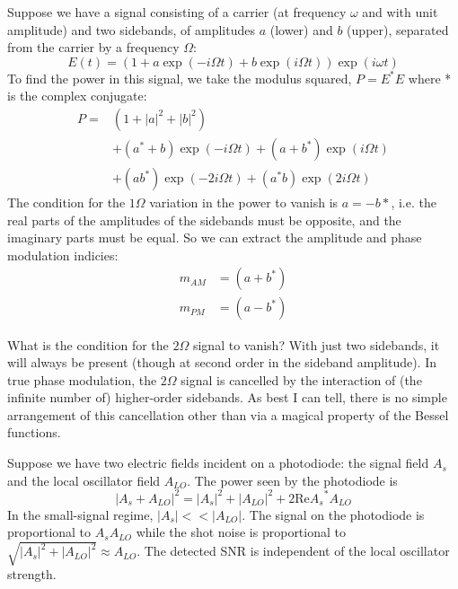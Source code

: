 \label{sec:am-vs-pm}
%
Suppose we have a signal consisting of a carrier (at frequency $\omega$ and
with unit amplitude) and two sidebands, of amplitudes $a$ (lower) and $b$
(upper), separated from the carrier by a frequency $\Omega$:
%
\begin{equation}
E(t) = \left(1 + a \exp(-i \Omega t) + b \exp(i \Omega t)\right)
\exp(i \omega t)
\end{equation}
%
To find the power in this signal, we take the
modulus squared, $P = E^*E$ where * is the complex conjugate:
%
\begin{equation}
\begin{split}
P = & \left(1 + |a|^2 + |b|^2\right) \\
    & + \left(a^* + b\right) \exp(-i \Omega t) + \left(a + b^*\right) \exp(i \Omega t) \\
    & + \left(ab^*\right) \exp(-2 i \Omega t) + \left(a^*b\right) \exp(2 i \Omega t)
\end{split}
\end{equation}
%
The condition for the $1\Omega$ variation in the power to vanish is
$a=-b*$, i.e. the real parts of the amplitudes of the sidebands must
be opposite, and the imaginary parts must be equal. So we can extract
the amplitude and phase modulation indicies:
%
\begin{equation}
\begin{split}
m_{AM} &= (a + b^*)\\
m_{PM} &= (a - b^*)
\end{split}
\end{equation}

What is the condition for the $2\Omega$ signal to vanish? With just
two sidebands, it will always be present (though at second order in
the sideband amplitude). In true phase modulation, the $2\Omega$
signal is cancelled by the interaction of (the infinite number of)
higher-order sidebands. As best I can tell, there is no simple
arrangement of this cancellation other than via a magical property of
the Bessel functions.


Suppose we have two electric fields incident on a photodiode: the
signal field $A_s$ and the local oscillator field $A_{LO}$.  The power
seen by the photodiode is
$$ \left| A_s + A_{LO} \right|^2 = 
   |A_s|^2 + |A_{LO}|^2 + 2 \mathrm{ Re } {A_s}^*A_{LO}$$
In the small-signal regime, $|A_s| << |A_{LO}|$.  The signal on the
photodiode is proportional to $A_s A_{LO}$ while the shot noise is
proportional to $\sqrt{|A_s|^2+|A_{LO}|^2}\approx A_{LO}$.  
  The detected SNR is independent of the local oscillator strength.


